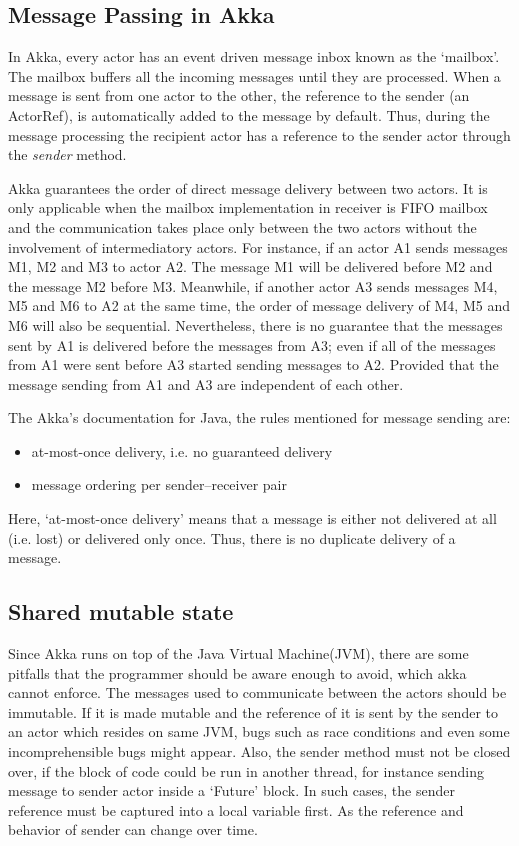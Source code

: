   \subsection{Message Passing in Akka}
  In Akka, every actor has an event driven message inbox known as the ‘mailbox’. The mailbox buffers all the incoming messages until they are processed. When a message is sent from one actor to the other, the reference to the sender (an ActorRef), is automatically added to the message by default. Thus, during the message processing the recipient actor has a reference to the sender actor through the \emph{sender} method.~\cite{akkaJavaDoc}

  Akka guarantees the order of direct message delivery between two actors. It is only applicable when the mailbox implementation in receiver is FIFO mailbox and the communication takes place only between the two actors without the involvement of intermediatory actors. For instance, if an actor A1 sends messages M1, M2 and M3 to actor A2. The message M1 will be delivered before M2 and the message M2 before M3. Meanwhile, if another actor A3 sends messages M4, M5 and M6 to A2 at the same time, the order of message delivery of M4, M5 and M6 will also be sequential. Nevertheless, there is no guarantee that the messages sent by A1 is delivered before the messages from A3; even if all of the messages from A1 were sent before A3 started sending messages to A2. Provided that the message sending from A1 and A3 are independent of each other. ~\cite{akkaJavaDoc}

  The Akka's documentation for Java, the rules mentioned for message sending are: \cite{akkaJavaDoc}
  \begin{itemize}
    \item at-most-once delivery, i.e. no guaranteed delivery
    \item message ordering per sender–receiver pair
  \end{itemize}

Here, ‘at-most-once delivery’ means that a message is either not delivered at all (i.e. lost) or delivered only once. Thus, there is no duplicate delivery of a message.

  \subsection{Shared mutable state}
  Since Akka runs on top of the Java Virtual Machine(JVM), there are some pitfalls that the programmer should be aware enough to avoid, which akka cannot enforce. The messages used to communicate between the actors should be immutable. If it is made mutable and the reference of it is sent by the sender to an actor which resides on same JVM, bugs such as race conditions and even some incomprehensible bugs might appear. Also, the sender method must not be closed over, if the block of code could be run in another thread, for instance sending message to sender actor inside a ‘Future’ block. In such cases, the sender reference must be captured into a local variable first. As the reference and behavior of sender can change over time.~\cite{akkaJavaDoc}

